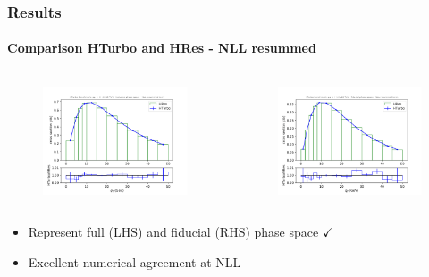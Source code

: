 \documentclass[aspectratio=43]{beamer}
\begin{document}
\begin{frame}
	
	\frametitle{Results}
	\framesubtitle{Comparison HTurbo and HRes - NLL resummed}
	
	\begin{columns}
		
		
		\begin{figure}
			\includegraphics[width = 7cm]{plots/part3/chapter6/nlo-res-1.png}
		\end{figure}
		
		
		\begin{figure}
			\includegraphics[width = 7cm]{plots/part3/chapter6/nlo-res-fid-1.png}
		\end{figure}
		
	\end{columns}
	
	\begin{itemize}
		\item \footnotesize Represent full (LHS) and fiducial (RHS) phase space {\color{darkgreen}$\checkmark$} 
		\item \footnotesize Excellent numerical agreement at NLL
	\end{itemize}

\end{frame}
\end{document}
